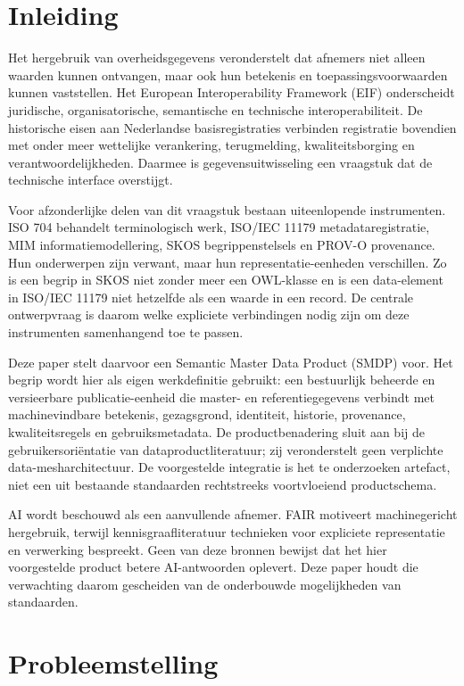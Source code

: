 \section{Inleiding}
Het hergebruik van overheidsgegevens veronderstelt dat afnemers niet alleen waarden kunnen ontvangen, maar ook hun betekenis en toepassingsvoorwaarden kunnen vaststellen. Het European Interoperability Framework (EIF) onderscheidt juridische, organisatorische, semantische en technische interoperabiliteit. De historische eisen aan Nederlandse basisregistraties verbinden registratie bovendien met onder meer wettelijke verankering, terugmelding, kwaliteitsborging en verantwoordelijkheden. Daarmee is gegevensuitwisseling een vraagstuk dat de technische interface overstijgt. \citep{S43,S25}

Voor afzonderlijke delen van dit vraagstuk bestaan uiteenlopende instrumenten. ISO 704 behandelt terminologisch werk, ISO/IEC 11179 metadata\-registratie, MIM informatiemodellering, SKOS begrippenstelsels en PROV-O provenance. Hun onderwerpen zijn verwant, maar hun representatie-eenheden verschillen. Zo is een begrip in SKOS niet zonder meer een OWL-klasse en is een data-element in ISO/IEC 11179 niet hetzelfde als een waarde in een record. \citep{S11,S08,S13,S31,S30,S33} De centrale ontwerpvraag is daarom welke expliciete verbindingen nodig zijn om deze instrumenten samenhangend toe te passen.

Deze paper stelt daarvoor een Semantic Master Data Product (SMDP) voor. Het begrip wordt hier als eigen werkdefinitie gebruikt: een bestuurlijk beheerde en versieerbare publicatie-eenheid die master- en referentiegegevens verbindt met machinevindbare betekenis, gezagsgrond, identiteit, historie, provenance, kwaliteitsregels en gebruiksmetadata. De productbenadering sluit aan bij de gebruikersoriëntatie van dataproductliteratuur; zij veronderstelt geen verplichte data-mesharchitectuur. \citep{L12} De voorgestelde integratie is het te onderzoeken artefact, niet een uit bestaande standaarden rechtstreeks voortvloeiend productschema.

AI wordt beschouwd als een aanvullende afnemer. FAIR motiveert machinegericht hergebruik, terwijl kennisgraafliteratuur technieken voor expliciete representatie en verwerking bespreekt. Geen van deze bronnen bewijst dat het hier voorgestelde product betere AI-antwoorden oplevert. \citep{L11,L13} Deze paper houdt die verwachting daarom gescheiden van de onderbouwde mogelijkheden van standaarden.

\section{Probleemstelling}
